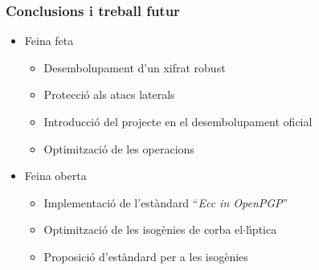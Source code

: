 \documentclass{beamer}
\def\lgem{l\ensuremath{\cdot}l}
\def\ce{corba e\lgem{}\'{\i}ptica}%
\theoremstyle{saltolinea}   			%
\begin{document}
\begin{frame}
  \frametitle{Conclusions i treball futur}
    \begin{itemize}
      \item<2-> Feina feta
      \begin{itemize}
        \item<3-> Desembolupament d'un xifrat robust
        \item<4-> Protecci\'o als atacs laterals
        \item<5-> Introducci\'o del projecte en el desembolupament oficial
        \item<6-> Optimitzaci\'o de les operacions
      \end{itemize}
    \end{itemize}
    \begin{itemize}
      \item<7-> Feina oberta
      \begin{itemize}
        \item<8-> Implementaci\'o de l'est\`andard ``\emph{Ecc in OpenPGP}''
        \item<9-> Optimitzaci\'o de les isog\`enies de \ce{}
        \item<10-> Proposici\'o d'est\`andard per a les isog\`enies
      \end{itemize}
    \end{itemize}
\end{frame}
\end{document}

